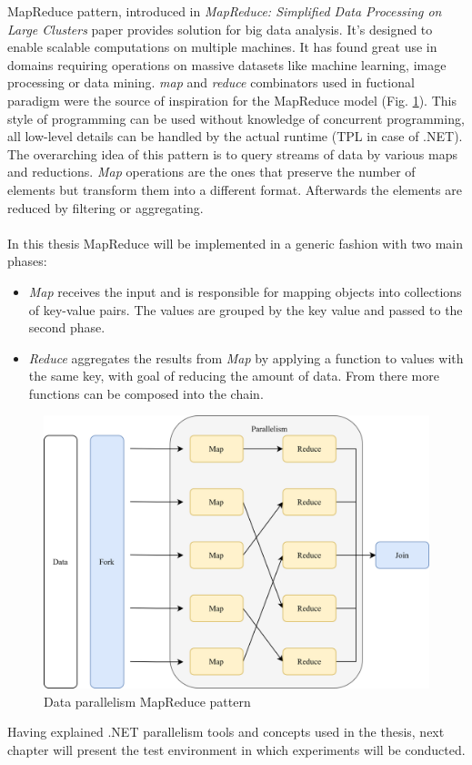 MapReduce pattern, introduced in \emph{MapReduce: Simplified
Data Processing on Large Clusters} \cite{MapReduce} paper provides solution for big data analysis. It's designed to enable scalable computations on multiple machines. It has found great use in domains requiring operations on massive datasets like machine learning, image processing or data mining.
\emph{map} and \emph{reduce} combinators used in fuctional paradigm were the source of inspiration for the MapReduce model (Fig. \ref{fig:MapReduce}). This style of programming can be used without knowledge of concurrent programming, all low-level details can be handled by the actual runtime (TPL in case of .NET).
The overarching idea of this pattern is to query streams of data by various maps and reductions. \emph{Map} operations are the ones that preserve the number of elements but transform them into a different format. Afterwards the elements are reduced by filtering or aggregating. 
\\ \\
In this thesis MapReduce will be implemented in a generic fashion with two main phases:
\begin{itemize}
	\item \emph{Map} receives the input and is responsible for mapping objects into collections of key-value pairs. The values are grouped by the key value and passed to the second phase.
\item \emph{Reduce} aggregates the results from \emph{Map} by applying a function to values with the same key, with goal of reducing the amount of data. From there more functions can be composed into the chain.
\end{itemize}

\begin{figure}[htb]
	\centering
		\includegraphics[scale=1.0]{figures02/mapreduce.png}
		\caption{Data parallelism MapReduce pattern}
		\label{fig:MapReduce}
\end{figure}

Having explained .NET parallelism tools and concepts used in the thesis, next chapter will present the test environment in which experiments will be conducted. 
